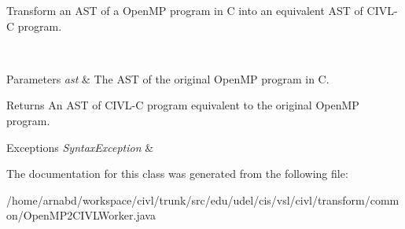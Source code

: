 Transform an A\+S\+T of a Open\+M\+P program in C into an equivalent A\+S\+T of C\+I\+V\+L-\/\+C program. 

~\newline



\begin{DoxyParams}{Parameters}
{\em ast} & The A\+S\+T of the original Open\+M\+P program in C. \\
\hline
\end{DoxyParams}
\begin{DoxyReturn}{Returns}
An A\+S\+T of C\+I\+V\+L-\/\+C program equivalent to the original Open\+M\+P program. 
\end{DoxyReturn}

\begin{DoxyExceptions}{Exceptions}
{\em Syntax\+Exception} & \\
\hline
\end{DoxyExceptions}


The documentation for this class was generated from the following file\+:\begin{DoxyCompactItemize}
\item 
/home/arnabd/workspace/civl/trunk/src/edu/udel/cis/vsl/civl/transform/common/Open\+M\+P2\+C\+I\+V\+L\+Worker.\+java\end{DoxyCompactItemize}
